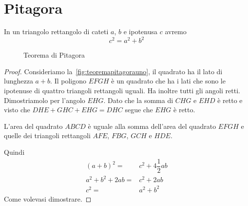 \chapter{Pitagora}
\begin{thm}
In un triangolo rettangolo di cateti $a$, $b$ e ipotenusa $c$ avremo\[c^2=a^2+b^2\]
\end{thm}
\begin{figure}
	\centering
	
	\caption{Teorema di Pitagora}
	\label{fig:teoremapitagorauno}
\end{figure}
\begin{proof}
	Consideriamo la~\vref{fig:teoremapitagorauno}, il quadrato ha il lato di lunghezza $a+b$.  Il poligono $EFGH$ è un quadrato che ha i lati che sono le ipotenuse di quattro triangoli rettangoli uguali. Ha inoltre tutti gli angoli retti. Dimostriamolo per l'angolo $EHG$. Dato che la somma di $CHG$ e $EHD$ è  retto e visto che $DHE+GHC+EHG=DHC$ segue che $EHG$ è retto.\par 
	L'area del quadrato $ABCD$ è uguale alla somma dell'area del quadrato $EFGH$ e quelle dei triangoli rettangoli $AFE$, $FBG$, $GCH$ e $HDE$.\par Quindi
	\begin{align*}
	(a+b)^2=&c^2+4\dfrac{1}{2}ab\\
	a^2+b^2+2ab=&c^2+2ab\\
	c^2=&a^2+b^2
	\end{align*}
	Come volevasi dimostrare.
\end{proof}